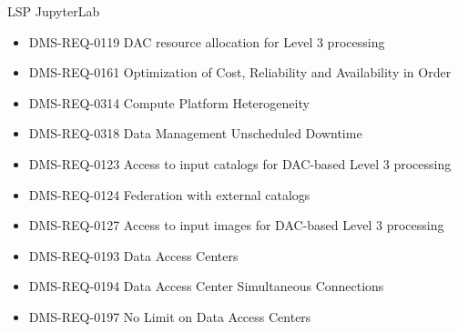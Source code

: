LSP JupyterLab \begin{itemize}
\item DMS-REQ-0119 DAC resource allocation for Level 3 processing
\item DMS-REQ-0161 Optimization of Cost, Reliability and Availability in Order
\item DMS-REQ-0314 Compute Platform Heterogeneity
\item DMS-REQ-0318 Data Management Unscheduled Downtime
\item DMS-REQ-0123 Access to input catalogs for DAC-based Level 3 processing
\item DMS-REQ-0124 Federation with external catalogs
\item DMS-REQ-0127 Access to input images for DAC-based Level 3 processing
\item DMS-REQ-0193 Data Access Centers
\item DMS-REQ-0194 Data Access Center Simultaneous Connections
\item DMS-REQ-0197 No Limit on Data Access Centers
\end{itemize}
